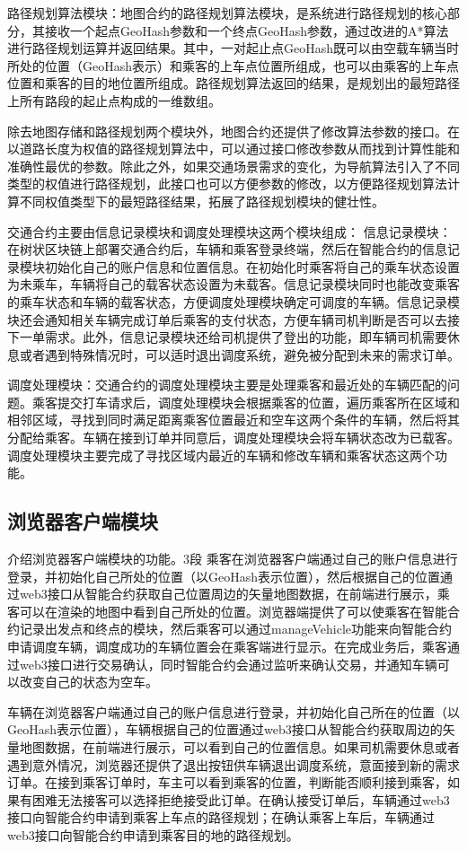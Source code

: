 路径规划算法模块：地图合约的路径规划算法模块，是系统进行路径规划的核心部分，其接收一个起点GeoHash参数和一个终点GeoHash参数，通过改进的A*算法进行路径规划运算并返回结果。其中，一对起止点GeoHash既可以由空载车辆当时所处的位置（GeoHash表示）和乘客的上车点位置所组成，也可以由乘客的上车点位置和乘客的目的地位置所组成。路径规划算法返回的结果，是规划出的最短路径上所有路段的起止点构成的一维数组。

除去地图存储和路径规划两个模块外，地图合约还提供了修改算法参数的接口。在以道路长度为权值的路径规划算法中，可以通过接口修改参数从而找到计算性能和准确性最优的参数。除此之外，如果交通场景需求的变化，为导航算法引入了不同类型的权值进行路径规划，此接口也可以方便参数的修改，以方便路径规划算法计算不同权值类型下的最短路径结果，拓展了路径规划模块的健壮性。

交通合约主要由信息记录模块和调度处理模块这两个模块组成：
信息记录模块：在树状区块链上部署交通合约后，车辆和乘客登录终端，然后在智能合约的信息记录模块初始化自己的账户信息和位置信息。在初始化时乘客将自己的乘车状态设置为未乘车，车辆将自己的载客状态设置为未载客。信息记录模块同时也能改变乘客的乘车状态和车辆的载客状态，方便调度处理模块确定可调度的车辆。信息记录模块还会通知相关车辆完成订单后乘客的支付状态，方便车辆司机判断是否可以去接下一单需求。此外，信息记录模块还给司机提供了登出的功能，即车辆司机需要休息或者遇到特殊情况时，可以适时退出调度系统，避免被分配到未来的需求订单。

调度处理模块：交通合约的调度处理模块主要是处理乘客和最近处的车辆匹配的问题。乘客提交打车请求后，调度处理模块会根据乘客的位置，遍历乘客所在区域和相邻区域，寻找到同时满足距离乘客位置最近和空车这两个条件的车辆，然后将其分配给乘客。车辆在接到订单并同意后，调度处理模块会将车辆状态改为已载客。调度处理模块主要完成了寻找区域内最近的车辆和修改车辆和乘客状态这两个功能。


\subsection{浏览器客户端模块}
介绍浏览器客户端模块的功能。3段
乘客在浏览器客户端通过自己的账户信息进行登录，并初始化自己所处的位置（以GeoHash表示位置），然后根据自己的位置通过web3接口从智能合约获取自己位置周边的矢量地图数据，在前端进行展示，乘客可以在渲染的地图中看到自己所处的位置。浏览器端提供了可以使乘客在智能合约记录出发点和终点的模块，然后乘客可以通过manageVehicle功能来向智能合约申请调度车辆，调度成功的车辆位置会在乘客端进行显示。在完成业务后，乘客通过web3接口进行交易确认，同时智能合约会通过监听来确认交易，并通知车辆可以改变自己的状态为空车。

车辆在浏览器客户端通过自己的账户信息进行登录，并初始化自己所在的位置（以GeoHash表示位置），车辆根据自己的位置通过web3接口从智能合约获取周边的矢量地图数据，在前端进行展示，可以看到自己的位置信息。如果司机需要休息或者遇到意外情况，浏览器还提供了退出按钮供车辆退出调度系统，意面接到新的需求订单。在接到乘客订单时，车主可以看到乘客的位置，判断能否顺利接到乘客，如果有困难无法接客可以选择拒绝接受此订单。在确认接受订单后，车辆通过web3接口向智能合约申请到乘客上车点的路径规划；在确认乘客上车后，车辆通过web3接口向智能合约申请到乘客目的地的路径规划。


